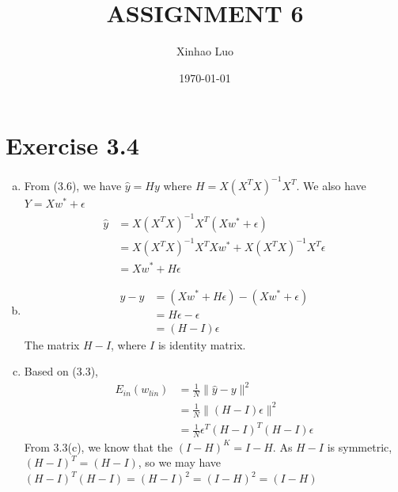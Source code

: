\documentclass{article}
\title{\bf \Large ASSIGNMENT 6}
\author{Xinhao Luo}
\date{\today}
\def\math#1{$#1$}
\begin{document}
\maketitle
\medskip

\section{Exercise 3.4}
\begin{enumerate}[a)]
    \item From (3.6), we have \math{\hat{y} = Hy} where \math{H = X(X^TX)^{-1}X^T}. We also have \math{Y = Xw^* + \epsilon}
        \begin{equation}
            \begin{split}
                \hat{y} &= X(X^TX)^{-1}X^T(Xw^* + \epsilon) \\
                &= X(X^TX)^{-1}X^TXw^* + X(X^TX)^{-1}X^T\epsilon \\
                &= Xw^* + H\epsilon
            \end{split}
        \end{equation}
    \item \begin{equation}
        \begin{split}
            \hat{y} - y &= (Xw^* + H\epsilon) - (Xw^* + \epsilon) \\
            &= H\epsilon - \epsilon \\
            &= (H - I) \epsilon
        \end{split}
    \end{equation}
    The matrix \math{H - I}, where \math{I} is identity matrix.
    \item Based on (3.3),
        \begin{equation}
            \begin{split}
                E_{in}(w_{lin}) &= \frac{1}{N} \|\hat{y} - y\|^2 \\
                &= \frac{1}{N} \|(H - I) \epsilon\|^2 \\
                &= \frac{1}{N} \epsilon^T(H - I)^T(H - I)\epsilon
            \end{split}
        \end{equation}
        From 3.3(c), we know that the \math{(I - H)^K = I - H}. As \math{H - I} is symmetric, \math{(H - I)^T = (H - I)}, so we may have \math{(H - I)^T(H - I) = (H - I)^2 = (I - H)^2 = (I - H)}
        \begin{equation}
            \begin{split}

\end{split}
\end{equation}
\end{enumerate}
\end{document}
